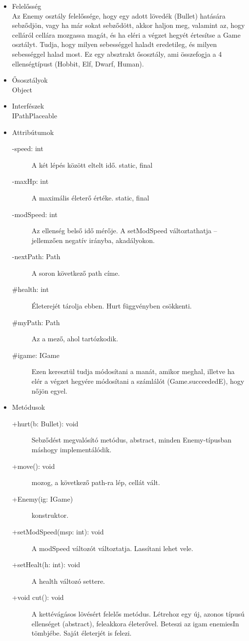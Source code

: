 \begin{itemize}
\item Felelősség\\
Az Enemy osztály felelőssége, hogy egy adott lövedék (Bullet) hatására sebződjön, vagy ha már sokat sebződött, akkor haljon meg, valamint az, hogy celláról cellára mozgassa magát, és ha eléri a végzet hegyét értesítse a Game osztályt. Tudja, hogy milyen sebességgel haladt eredetileg, és milyen sebességgel halad most. Ez egy absztrakt ősosztály, ami összefogja a 4 ellenségtípust (Hobbit, Elf, Dwarf, Human).
\item Ősosztályok\\
Object
\item Interfészek\\
IPathPlaceable
\item Attribútumok\\
	\begin{description}
		\item[-speed: int] A két lépés között eltelt idő. static, final
		\item[-maxHp: int] A maximális életerő értéke. static, final
\item[-modSpeed: int] Az ellenség belső idő mérője. A setModSpeed változtathatja – jellemzően negatív irányba, akadályokon. 
\item[-nextPath: Path] A soron következő path címe. 
\item[\#health: int] Életerejét tárolja ebben. Hurt függvényben csökkenti. 
\item[\#myPath: Path] Az a mező, ahol tartózkodik. 
\item[\#igame: IGame] Ezen keresztül tudja módosítani a manát, amikor meghal, illetve ha elér a végzet hegyére módosítani a számlálót (Game.succeededE), hogy nőjön egyel. 

	\end{description}
\item Metódusok\\
	\begin{description}
		\item[+hurt(b: Bullet): void] Sebződést megvalósító metódus, abstract, minden Enemy-típusban máshogy implementálódik. 
\item[+move(): void] mozog, a következő path-ra lép, cellát vált. 
\item[+Enemy(ig: IGame)] konstruktor. 
\item[+setModSpeed(msp: int): void] A modSpeed változót változtatja. Lassítani lehet vele. 
\item[+setHealt(h: int): void] A health változó settere. 
\item[+void cut(): void] A kettévágásos lövésért felelős metódus. Létrehoz egy új, azonos típusú ellenséget (abstract), feleakkora életerővel. Beteszi az igam enemiesIn tömbjébe. Saját életerjét is felezi. 

	\end{description}
\end{itemize}

